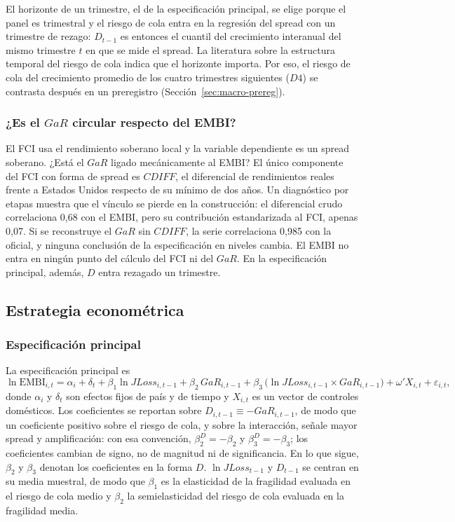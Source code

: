 El horizonte de un trimestre, el de la especificación principal, se elige porque el panel es trimestral y el riesgo de cola entra en la regresión del spread con un trimestre de rezago: $D_{t-1}$ es entonces el cuantil del crecimiento interanual del mismo trimestre $t$ en que se mide el spread. La literatura sobre la estructura temporal del riesgo de cola \citep{AdrianEtAl2022} indica que el horizonte importa. Por eso, el riesgo de cola del crecimiento promedio de los cuatro trimestres siguientes ($D4$) se contrasta después en un preregistro (Sección~\ref{sec:macro-prereg}).

\subsubsection{¿Es el \texorpdfstring{$GaR$}{GaR} circular respecto del EMBI?}
\label{sec:ryr-endogeneidad}

El FCI usa el rendimiento soberano local y la variable dependiente es un spread soberano. ¿Está el $GaR$ ligado mecánicamente al EMBI? El único componente del FCI con forma de spread es $CDIFF$, el diferencial de rendimientos reales frente a Estados Unidos respecto de su mínimo de dos años. Un diagnóstico por etapas muestra que el vínculo se pierde en la construcción: el diferencial crudo correlaciona 0,68 con el EMBI, pero su contribución estandarizada al FCI, apenas 0,07. Si se reconstruye el $GaR$ sin $CDIFF$, la serie correlaciona 0,985 con la oficial, y ninguna conclusión de la especificación en niveles cambia. El EMBI no entra en ningún punto del cálculo del FCI ni del $GaR$. En la especificación principal, además, $D$ entra rezagado un trimestre.

\subsection{Estrategia econométrica}
\label{sec:estrategia}

\subsubsection{Especificación principal}

La especificación principal es
\begin{equation}
\ln\mathrm{EMBI}_{i,t}=\alpha_i+\delta_t+\beta_1\ln JLoss_{i,t-1}+\beta_2\,GaR_{i,t-1}+\beta_3\,\bigl(\ln JLoss_{i,t-1}\times GaR_{i,t-1}\bigr)+\omega'X_{i,t}+\varepsilon_{i,t},
\label{eq:principal}
\end{equation}
donde $\alpha_i$ y $\delta_t$ son efectos fijos de país y de tiempo y $X_{i,t}$ es un vector de controles domésticos. Los coeficientes se reportan sobre $D_{i,t-1}\equiv-GaR_{i,t-1}$, de modo que un coeficiente positivo sobre el riesgo de cola, y sobre la interacción, señale mayor spread y amplificación: con esa convención, $\beta_2^D=-\beta_2$ y $\beta_3^D=-\beta_3$; los coeficientes cambian de signo, no de magnitud ni de significancia. En lo que sigue, $\beta_2$ y $\beta_3$ denotan los coeficientes en la forma $D$. $\ln JLoss_{t-1}$ y $D_{t-1}$ se centran en su media muestral, de modo que $\beta_1$ es la elasticidad de la fragilidad evaluada en el riesgo de cola medio y $\beta_2$ la semielasticidad del riesgo de cola evaluada en la fragilidad media.

